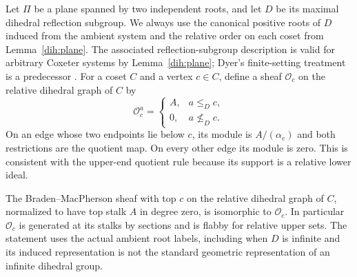 Let $\Pi$ be a plane spanned by two independent roots, and let $D$ be its
maximal dihedral reflection subgroup.  We always use the canonical
positive roots of $D$ induced from the ambient system and the relative
order on each coset from Lemma~\ref{dih:plane}.
The associated reflection-subgroup description is valid for arbitrary
Coxeter systems by Lemma~\ref{dih:plane}; Dyer's finite-setting treatment
is a predecessor \cite{Dyer91}.
For a coset $C$ and a vertex $c\in C$, define a sheaf
$\mathcal O_c$ on the relative dihedral graph of $C$ by
\[
 \mathcal O_c^a=
 \begin{cases}
 A,&a\le_D c,\\
 0,&a\not\le_D c.
 \end{cases}
\]
On an edge whose two endpoints lie below $c$, its module is
$A/(\alpha_e)$ and both restrictions are the quotient map.  On every
other edge its module is zero.  This is consistent with the upper-end
quotient rule because its support is a relative lower ideal.

\begin{lemma}
\label{loc:models}
The Braden--MacPherson sheaf with top $c$ on the relative dihedral graph
of $C$, normalized to have top stalk $A$ in degree zero, is isomorphic to
$\mathcal O_c$.  In particular $\mathcal O_c$ is generated at its stalks by
sections and is flabby for relative upper sets.
The statement uses the actual ambient root labels, including when $D$ is
infinite and its induced representation is not the standard geometric
representation of an infinite dihedral group.
\end{lemma}

